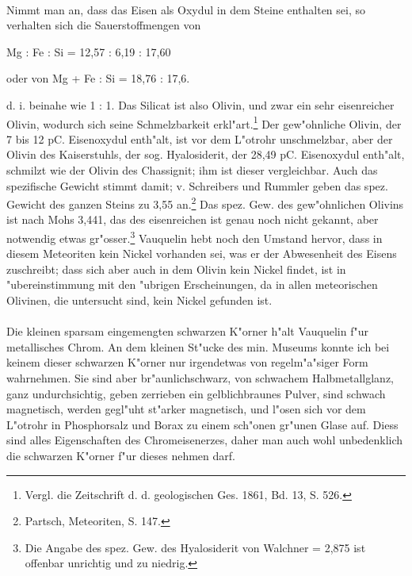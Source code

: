 \documentclass[a4paper, 11pt, oneside]{article}
\begin{document}
\paragraph{}
Nimmt man an, dass das Eisen als Oxydul in dem Steine enthalten sei, so verhalten sich die Sauerstoffmengen von
\begin{center}
Mg : Fe : Si = 12,57 : 6,19 : 17,60 
\end{center}
\begin{center}
oder von Mg + Fe : Si = 18,76 : 17,6.
\end{center}
d. i. beinahe wie 1 : 1. Das Silicat ist also Olivin, und zwar ein sehr eisenreicher Olivin, wodurch sich seine Schmelzbarkeit erkl"art.\footnote{Vergl. die Zeitschrift d. d. geologischen Ges. 1861, Bd. 13, S. 526.} Der gew"ohnliche Olivin, der 7 bis 12 pC. Eisenoxydul enth"alt, ist vor dem L"otrohr unschmelzbar, aber der Olivin des Kaiserstuhls, der sog. Hyalosiderit, der 28,49 pC. Eisenoxydul enth"alt, schmilzt wie der Olivin des Chassignit; ihm ist dieser vergleichbar. Auch das spezifische Gewicht stimmt damit; v. Schreibers und Rummler geben das spez. Gewicht des ganzen Steins zu 3,55 an.\footnote{Partsch, Meteoriten, S. 147.} Das spez. Gew. des gew"ohnlichen Olivins ist nach Mohs 3,441, das des eisenreichen ist genau noch nicht gekannt, aber notwendig etwas gr"osser.\footnote{Die Angabe des spez. Gew. des Hyalosiderit von Walchner = 2,875 ist offenbar unrichtig und zu niedrig.} Vauquelin hebt noch den Umstand hervor, dass in diesem Meteoriten kein Nickel vorhanden sei, was er der Abwesenheit des Eisens zuschreibt; dass sich aber auch in dem Olivin kein Nickel findet, ist in "ubereinstimmung mit den "ubrigen Erscheinungen, da in allen meteorischen Olivinen, die untersucht sind, kein Nickel gefunden ist.
\paragraph{}
Die kleinen sparsam eingemengten schwarzen K"orner h"alt Vauquelin f"ur metallisches Chrom. An dem kleinen St"ucke des min. Museums konnte ich bei keinem dieser schwarzen K"orner nur irgendetwas von regelm"a"siger Form wahrnehmen. Sie sind aber br"aunlichschwarz, von schwachem Halbmetallglanz, ganz undurchsichtig, geben zerrieben ein gelblichbraunes Pulver, sind schwach magnetisch, werden gegl"uht st"arker magnetisch, und l"osen sich vor dem L"otrohr in Phosphorsalz und Borax zu einem sch"onen gr"unen Glase auf. Diess sind alles Eigenschaften des Chromeisenerzes, daher man auch wohl unbedenklich die schwarzen K"orner f"ur dieses nehmen darf.
\end{document}
